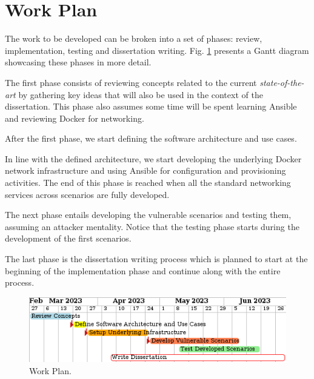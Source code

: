 \section{Work Plan} \label{sec:work_plan}

The work to be developed can be broken into a set of phases: review, implementation, testing and dissertation writing. Fig. \ref{fig:gant_diagram} presents a Gantt diagram showcasing these phases in more detail.

The first phase consists of reviewing concepts related to the current \textit{state-of-the-art} by gathering key ideas that will also be used in the context of the dissertation. This phase also assumes some time will be spent learning Ansible and reviewing Docker for networking.

After the first phase, we start defining the software architecture and use cases. 

In line with the defined architecture, we start developing the underlying Docker network infrastructure and using Ansible for configuration and provisioning activities. The end of this phase is reached when all the standard networking services across scenarios are fully developed.

The next phase entails developing the vulnerable scenarios and testing them, assuming an attacker mentality. Notice that the testing phase starts during the development of the first scenarios.

The last phase is the dissertation writing process which is planned to start at the beginning of the implementation phase and continue along with the entire process.

\begin{figure}[H]
    \includegraphics[width=12cm]{figures/gant_diagram.png}
    \caption{Work Plan.}
    \label{fig:gant_diagram}
\end{figure}